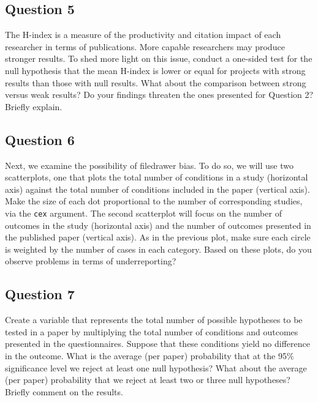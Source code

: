 \documentclass[]{article}
\begin{document}
\subsection{Question 5}\label{question-5}

The H-index is a measure of the productivity and citation impact of each
researcher in terms of publications. More capable researchers may
produce stronger results. To shed more light on this issue, conduct a
one-sided test for the null hypothesis that the mean H-index is lower or
equal for projects with strong results than those with null results.
What about the comparison between strong versus weak results? Do your
findings threaten the ones presented for Question 2? Briefly explain.

\subsection{Question 6}\label{question-6}

Next, we examine the possibility of filedrawer bias. To do so, we will
use two scatterplots, one that plots the total number of conditions in a
study (horizontal axis) against the total number of conditions included
in the paper (vertical axis). Make the size of each dot proportional to
the number of corresponding studies, via the \texttt{cex} argument. The
second scatterplot will focus on the number of outcomes in the study
(horizontal axis) and the number of outcomes presented in the published
paper (vertical axis). As in the previous plot, make sure each circle is
weighted by the number of cases in each category. Based on these plots,
do you observe problems in terms of underreporting?

\subsection{Question 7}\label{question-7}

Create a variable that represents the total number of possible
hypotheses to be tested in a paper by multiplying the total number of
conditions and outcomes presented in the questionnaires. Suppose that
these conditions yield no difference in the outcome. What is the average
(per paper) probability that at the 95\% significance level we reject at
least one null hypothesis? What about the average (per paper)
probability that we reject at least two or three null hypotheses?
Briefly comment on the results.
\end{document}
